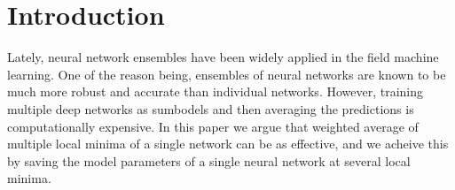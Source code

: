 \section{Introduction}
Lately, neural network ensembles have been widely applied in the field machine learning. One of the reason being,
ensembles of neural networks are known to be much more robust and accurate than individual networks. However, 
training multiple deep networks as sumbodels and then averaging the predictions is computationally expensive.
In this paper we argue that weighted average of multiple local minima of a single network can be as effective,
and we acheive this by saving the model parameters of a single neural network at several local minima.